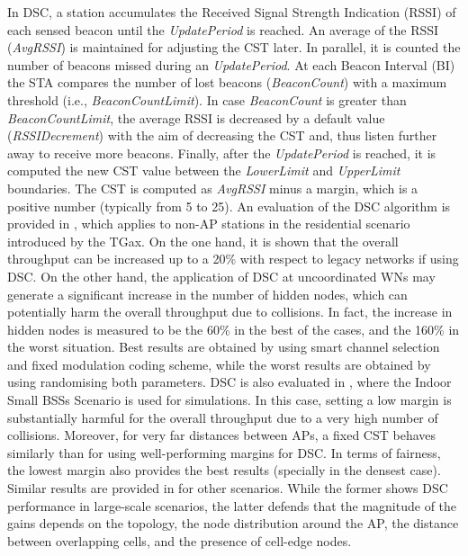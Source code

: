 \documentclass[12pt, a4paper,twoside]{tesi_upf}
\begin{document}
				In DSC, a station accumulates the Received Signal Strength Indication (RSSI) of  each  sensed  beacon until the \textit{UpdatePeriod} is reached. An average of the RSSI (\textit{AvgRSSI}) is maintained for adjusting the CST later. In parallel, it is counted the number of beacons missed during an \textit{UpdatePeriod}. At each Beacon Interval (BI) the STA compares the number of lost beacons (\textit{BeaconCount}) with a maximum threshold (i.e., \textit{BeaconCountLimit}). In case \textit{BeaconCount} is greater than \textit{BeaconCountLimit}, the average RSSI is decreased by a default value (\textit{RSSIDecrement}) with the aim of decreasing the CST and, thus listen further away to receive more beacons. Finally, after the \textit{UpdatePeriod} is reached, it is computed the new CST value between the \textit{LowerLimit} and \textit{UpperLimit} boundaries. The CST is computed as \textit{AvgRSSI} minus a margin, which is a positive number (typically from 5 to 25). An evaluation of the DSC algorithm is provided in \cite{afaqui2015evaluation}, which applies to non-AP stations in the residential scenario introduced by the TGax. On the one hand, it is shown that the overall throughput can be increased up to a 20\% with respect to legacy networks if using DSC. On the other hand, the application of DSC at uncoordinated WNs may generate a significant increase in the number of hidden nodes, which can potentially harm the overall throughput due to collisions. In fact, the increase in hidden nodes is measured to be the 60\% in the best of the cases, and the 160\% in the worst situation. Best results are obtained by using smart channel selection and fixed modulation coding scheme, while the worst results are obtained by using randomising both parameters. DSC is also evaluated in \cite{zhong2016promise}, where the Indoor Small BSSs Scenario is used for simulations. In this case, setting a low margin is substantially harmful for the overall throughput due to a very high number of collisions. Moreover, for very far distances between APs, a fixed CST behaves similarly than for using well-performing margins for DSC. In terms of fairness, the lowest margin also provides the best results (specially in the densest case). Similar results are provided in \cite{selinis2016evaluation, kulkarni2015taming} for other scenarios. While the former shows DSC performance in large-scale scenarios, the latter defends that the magnitude of the gains depends on the topology, the node distribution around the AP, the distance between overlapping cells, and the presence of cell-edge nodes. 
				
\end{document}
